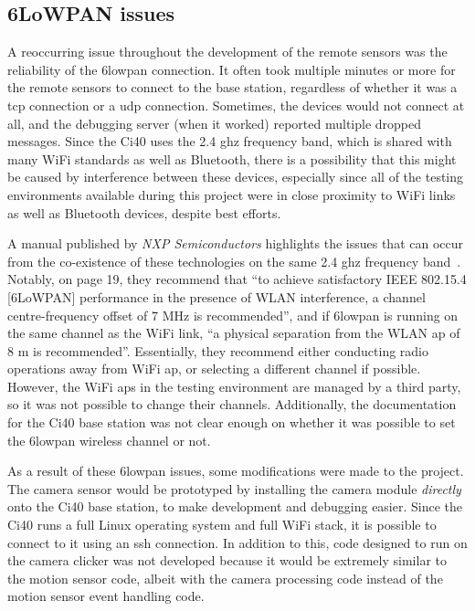 \subsection{6LoWPAN issues}
A reoccurring issue throughout the development of the remote sensors was the
reliability of the \gls{6lowpan} connection. It often took multiple minutes
or more for the remote sensors to connect to the base station, regardless of
whether it was a \acrshort{tcp} connection or a \acrshort{udp} connection.
Sometimes, the devices would not connect at all, and the debugging server
(when it worked) reported multiple dropped messages. Since the Ci40 uses the
2.4 \acrshort{ghz} frequency band, which is shared with many WiFi standards
as well as Bluetooth, there is a possibility that this might be caused by
interference between these devices, especially since all of the testing
environments available during this project were in close proximity to WiFi
links as well as Bluetooth devices, despite best efforts.

A manual published by \textit{NXP Semiconductors} highlights the issues that
can occur from the co-existence of these technologies on the same 2.4
\acrshort{ghz} frequency band~\cite{nxp2013ieee802154coexistence}. Notably,
on page 19, they recommend that ``to achieve satisfactory IEEE 802.15.4
[6LoWPAN] performance in the presence of WLAN interference, a channel
centre-frequency offset of 7 MHz is recommended'', and if \gls{6lowpan} is
running on the same channel as the WiFi link, ``a physical separation from
the WLAN \acrfull{ap} of 8 m is recommended''. Essentially, they recommend
either conducting radio operations away from WiFi \acrshort{ap}, or selecting
a different channel if possible. However, the WiFi \acrshort{ap}s in the
testing environment are managed by a third party, so it was not possible to
change their channels. Additionally, the documentation for the Ci40 base
station was not clear enough on whether it was possible to set the
\gls{6lowpan} wireless channel or not.

As a result of these \gls{6lowpan} issues, some modifications were made to
the project. The camera sensor would be prototyped by installing the camera
module \textit{directly} onto the Ci40 base station, to make development and
debugging easier. Since the Ci40 runs a full Linux operating system and full
WiFi stack, it is possible to connect to it using an \acrfull{ssh}
connection. In addition to this, code designed to run on the camera clicker
was not developed because it would be extremely similar to the motion sensor
code, albeit with the camera processing code instead of the motion sensor
event handling code.

